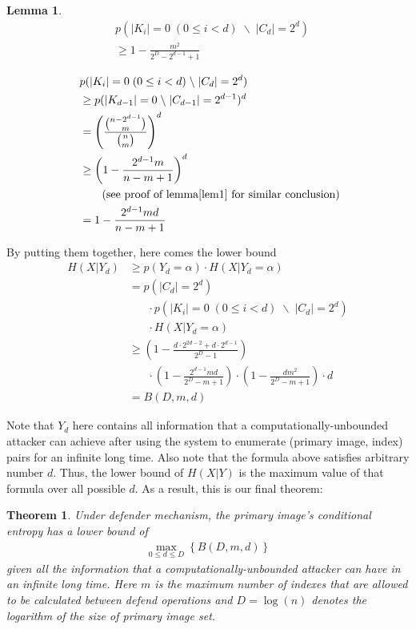 \documentclass[10pt, conference, compsocconf]{IEEEtran}
\newtheorem{mylemma}{Lemma}
\newtheorem{mytheorem}{Theorem}
\begin{document}
		\begin{mylemma}
			\begin{align*}
			&p(|K_i| = 0	\; (0 \leq i < d) \; \backslash \; |C_d| = 2^d) \\
				&\geq 1-\frac{m^2}{2^D-2^{d-1}+1}
			\end{align*}
		\end{mylemma}
		
		\begin{IEEEproof}
			\begin{align*}
				&p(|K_i| = 0	\; (0 \leq i < d) \; \backslash \; |C_d| = 2^d) \\\
					&\geq p(|K_{d-1}| = 0 \; \backslash \; |C_{d-1}| = 2^{d-1})^d\\
					&= \left(\frac{\binom{n-2^{d-1}}{m}}{\binom{n}{m}} \right)^d\\
					&\geq \left(1-\frac{2^{d-1}m}{n-m+1}\right)^d	\; \\
					& \;\;\;\;\;\; \text{ (see proof of lemma\ref{lem1} for similar conclusion})\\
					&= 1-\frac{2^{d-1}m d}{n-m+1}
			\end{align*}
		\end{IEEEproof}
		
		By putting them together, here comes the lower bound
		\begin{align*}
			H(X | Y_d) &\geq p(Y_d = \alpha) \cdot H(X | Y_d = \alpha)\\
				&= p(|C_d| = 2^d) \\
					&\;\;\;\;\;\; \cdot p(|K_i| = 0	\; (0 \leq i < d) \; \backslash \; |C_d| = 2^d) \\
					&\;\;\;\;\;\; \cdot H(X | Y_d = \alpha)\\
				&\geq (1-\frac{d \cdot 2^{2d-2}+d \cdot 2^{d-1}}{2^D-1})\\
					&\;\;\;\;\;\; \cdot (1-\frac{2^{d-1}m d}{2^D-m+1}) 
					\cdot (1-\frac{dm^2}{2^D-m+1}) \cdot d \\
				&= B(D, m, d)
		\end{align*}
		
		Note that $Y_d$ here contains all
		information that a computationally-unbounded
		attacker can achieve after
		using the system to enumerate (primary image, index) pairs
		for an infinite long time. Also note that the formula above
		satisfies arbitrary number $d$. Thus, the lower bound
		of $H(X | Y)$ is the maximum value of that formula
		over all possible $d$.
		As a result, this is our final theorem:
		\begin{mytheorem}\label{thm1}
			Under defender mechanism,
			the primary image's conditional entropy has a lower bound of
			\begin{align*}
				\max_{0 \leq d \leq D} \left\{ B(D, m, d) \right\}
			\end{align*}
			given all the information
			that a computationally-unbounded attacker can
			have in an infinite long time. Here $m$ is
			the maximum number of indexes that are allowed to be calculated
			between defend operations and $D = \log(n)$ denotes the
			logarithm of the size of primary image set.
		\end{mytheorem}
		
\end{document}
